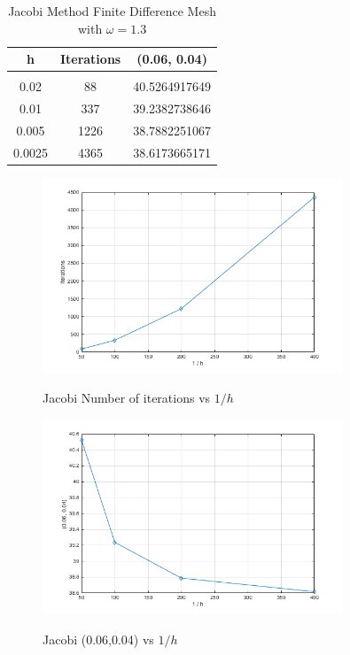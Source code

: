 \documentclass[11pt]{amsart}
\begin{document}
\begin{table}[h!]
    \caption{Jacobi Method Finite Difference Mesh with $\omega =1.3$}
    \label{tbl:fdm_mesh_3}
    \begin{tabular}{ c | c | c}
    	\textbf{h} & \textbf{Iterations} & \textbf{(0.06, 0.04)}\\ \hline \\
	0.02 & 88 & 40.5264917649\\
	0.01 & 337 & 39.2382738646\\
	0.005 & 1226 & 38.7882251067\\
	0.0025 & 4365 & 38.6173665171
    \end{tabular}
\end{table}
\begin{center}
	\begin{figure}[h]
		\caption{Jacobi Number of iterations vs $1 / h$}
		\includegraphics[width=0.8\textwidth]{assets/J_itr_v_1_o_h.png}\label{fig:J_itr_vs_1_o_h}
	\end{figure}
\end{center}
\begin{center}
	\begin{figure}[h]
		\caption{Jacobi (0.06,0.04) vs $1 / h$}
		\includegraphics[width=0.8\textwidth]{assets/J_point_v_1_o_h.png}\label{fig:J_point_vs_1_o_h}
	\end{figure}
\end{center}
\end{document}
